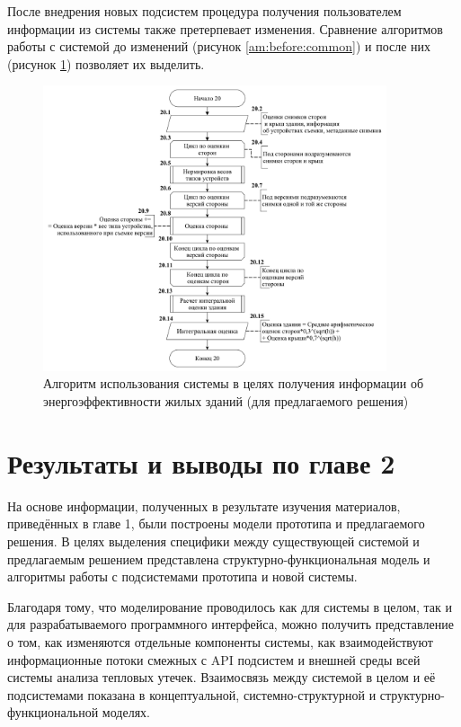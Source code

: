 \pagebreak

\par
	После внедрения новых подсистем процедура получения пользователем информации из системы также претерпевает изменения. Сравнение алгоритмов работы с системой до изменений (рисунок \ref{am:before:common}) и после них (рисунок \ref{am:after:common}) позволяет их выделить.

	\begin{figure}[t!]
      \centering
      \includegraphics[width=0.9\textwidth]{images/am/am02_after}
      \caption{Алгоритм использования системы в целях получения информации об энергоэффективности жилых зданий (для предлагаемого решения)}
      \label{am:after:common}
    \end{figure}

\pagebreak

\section{Результаты и выводы по главе 2}
\label{sec:models:summary}

\par
	На основе информации, полученных в результате изучения материалов, приведённых в главе 1, были построены модели прототипа и предлагаемого решения. В целях выделения специфики между существующей системой и предлагаемым решением представлена структурно-функциональная модель и алгоритмы работы с подсистемами прототипа и новой системы.

	Благодаря тому, что моделирование проводилось как для системы в целом, так и для разрабатываемого программного интерфейса, можно получить представление о том, как изменяются отдельные компоненты системы, как взаимодействуют информационные потоки смежных с API подсистем и внешней среды всей системы анализа тепловых утечек. Взаимосвязь между системой в целом и её подсистемами показана в концептуальной, системно-структурной и структурно-функциональной моделях.

